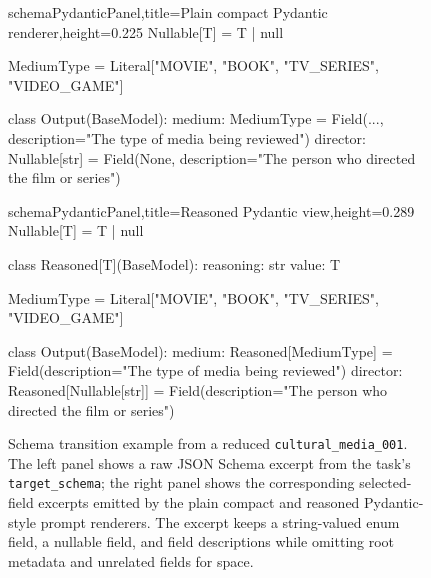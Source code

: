 \begin{figure}[!htbp]
\centering
\begin{minipage}[t]{0.485\linewidth}
\vspace{0pt}
\end{minipage}\hfill
\begin{minipage}[t]{0.485\linewidth}
\vspace{0pt}
\begin{tcblisting}{schemaPydanticPanel,title={Plain compact Pydantic renderer},height=0.225\textheight}
Nullable[T] = T | null

MediumType = Literal["MOVIE", "BOOK", "TV_SERIES", "VIDEO_GAME"]

class Output(BaseModel):
    medium: MediumType = Field(..., description="The type of media being reviewed")
    director: Nullable[str] = Field(None, description="The person who directed the film or series")
\end{tcblisting}
\vspace{0.006\textheight}
\begin{tcblisting}{schemaPydanticPanel,title={Reasoned Pydantic view},height=0.289\textheight}
Nullable[T] = T | null

class Reasoned[T](BaseModel):
    reasoning: str
    value: T

MediumType = Literal["MOVIE", "BOOK", "TV_SERIES", "VIDEO_GAME"]

class Output(BaseModel):
    medium: Reasoned[MediumType] = Field(description="The type of media being reviewed")
    director: Reasoned[Nullable[str]] = Field(description="The person who directed the film or series")
\end{tcblisting}
\end{minipage}
\caption{Schema transition example from a reduced \texttt{cultural\_media\_001}. The left panel shows a raw JSON Schema excerpt from the task's \texttt{target\_schema}; the right panel shows the corresponding selected-field excerpts emitted by the plain compact and reasoned Pydantic-style prompt renderers. The excerpt keeps a string-valued enum field, a nullable field, and field descriptions while omitting root metadata and unrelated fields for space.}
\label{fig:schema-transition-example}
\end{figure}

